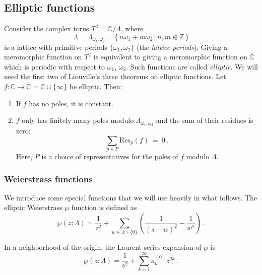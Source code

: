 \documentclass[11pt,a4paper]{article}
\numberwithin{equation}{section}
\begin{document}
\subsection{Elliptic functions}\label{sec:elliptic-functions}

Consider the complex torus 
$T^2 = \mathbb{C}/\Lambda$, where
\begin{equation}
\Lambda  = \Lambda_{\omega_1,\omega_2} = \big\{\,n \omega_1 +m \omega_2\,\big|\, n,m\in \mathbb{Z} \,\big\}
\end{equation}
is a lattice with primitive periods $\{\omega_1,\omega_2\}$ (the \textit{lattice periods}). 
Giving a meromorphic function on $T^2$ is equivalent to giving a meromorphic function on $\mathbb{C}$ which is periodic with respect to $\omega_1$, $\omega_2$. Such functions are called \textit{elliptic}. We will need the first two of Liouville's three theorems on elliptic functions. Let $f : \mathbb{C} \to \overline{\mathbb{C}} = \mathbb{C} \cup \{\infty\}$ be elliptic. Then:
\begin{enumerate}
\item If $f$ has no poles, it is constant.
\item $f$ only has finitely many poles modulo $\Lambda_{\omega_1,\omega_2}$ and the sum of their residues is zero:
\begin{equation}\label{eq:ResIsZero}
\sum_{p\in P} \text{Res}_p(f) ~=~ 0~.
\end{equation}
Here, $P$ is a choice of representatives for the poles of $f$ modulo $\Lambda$.
\end{enumerate}

\subsubsection{Weierstrass functions}

We introduce some special functions that we will use heavily in what follows. 
The elliptic Weierstrass $\wp$ function is defined as
%
\begin{equation}\label{eq:wp1}
    \wp(z;\Lambda) = \frac{1}{z^2} + \sum_{w\in\Lambda\backslash\{0\}}\left(\frac{1}{(z-w)^2}-\frac{1}{w^2}\right)\,.
\end{equation}

\noindent
In a neighborhood of the origin, the Laurent series expansion of $\wp$ is 
%
\begin{equation}\label{eq:wp2}
    \wp(z;\Lambda) = \frac{1}{z^2} + \sum_{k=1}^\infty a^{(0)}_k z^{2k}\,.
\end{equation}
\end{document}
